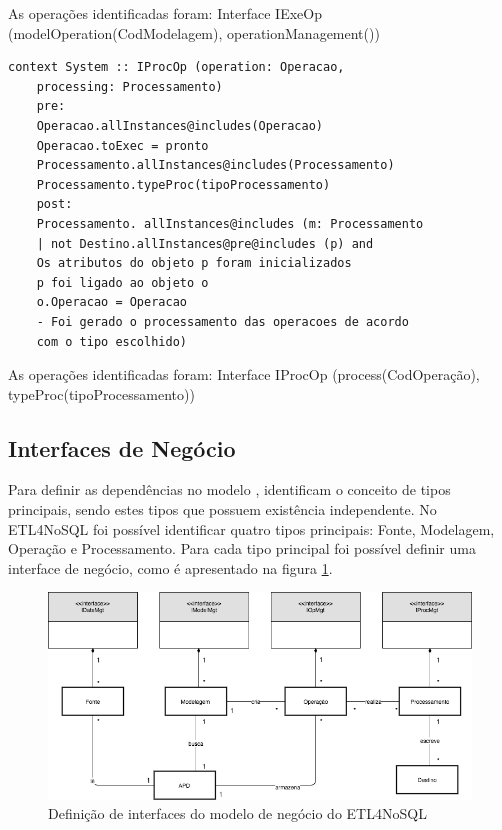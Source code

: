 As operações identificadas foram: Interface IExeOp (modelOperation(CodModelagem), operationManagement())

\begin{lstlisting}[frame=single, language=Oberon-2, basicstyle=\tiny]
	context System :: IProcOp (operation: Operacao, 
	processing: Processamento)	
	pre:
	Operacao.allInstances@includes(Operacao) 
	Operacao.toExec = pronto	
	Processamento.allInstances@includes(Processamento) 
	Processamento.typeProc(tipoProcessamento)	
	post:		
	Processamento. allInstances@includes (m: Processamento 
	| not Destino.allInstances@pre@includes (p) and	
	Os atributos do objeto p foram inicializados
	p foi ligado ao objeto o
	o.Operacao = Operacao
	- Foi gerado o processamento das operacoes de acordo 
	com o tipo escolhido)

\end{lstlisting}

As operações identificadas foram: Interface IProcOp (process(CodOperação), typeProc(tipoProcessamento))

\subsection{Interfaces de Negócio}

Para definir as dependências no modelo \cite{cheesman:2001}, identificam o conceito de tipos principais, sendo estes tipos que possuem existência independente.
No ETL4NoSQL foi possível identificar quatro tipos principais: Fonte, Modelagem, Operação e Processamento. Para cada tipo principal foi possível definir uma interface de negócio, como é apresentado na figura \ref{modelo_negocio}.

\begin{figure}[h]
	\centering
	\includegraphics[scale=0.58]{fig/modelo_negocio.png}
	\caption{Definição de interfaces do modelo de negócio do ETL4NoSQL}
	\label{modelo_negocio}
\end{figure}

